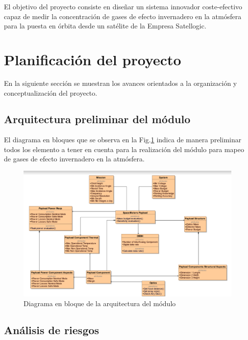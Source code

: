 \documentclass[11pt,titlepage]{article}
\begin{document}
El objetivo del proyecto consiste en diseñar un sistema innovador coste-efectivo capaz de medir la concentración de gases de efecto invernadero en la atmósfera para la puesta en órbita desde un satélite de la Empresa Satellogic.


\newpage

\section{Planificación del proyecto}

En la siguiente sección se muestran los avances orientados a la organización y conceptualización del proyecto.

\subsection{Arquitectura preliminar del módulo}

El diagrama en bloques que se observa en la Fig.\ref{fig:payload} indica de manera preliminar todos los elemento a tener en cuenta para la realización del módulo para mapeo de gases de efecto invernadero en la atmósfera.


\begin{figure}[htb!]
    \centering
    \includegraphics[width=15cm]{fig/payload.png}
    \caption{Diagrama en bloque de la arquitectura del módulo}
    \label{fig:payload}
\end{figure}

\subsection{Análisis de riesgos}
\end{document}
